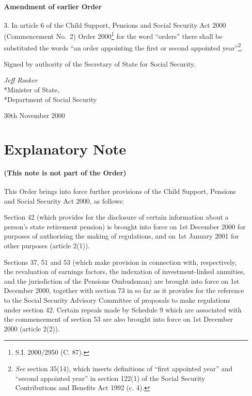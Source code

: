 \documentclass[12pt,a4paper]{article}
\begin{document}
\subsection[3. Amendment of earlier Order]{Amendment of earlier Order}

3.  In article 6 of the Child Support, Pensions and Social Security Act 2000 (Commencement No.\ 2) Order 2000\footnote{\frenchspacing S.I. 2000/2950 (C. 87).} for the word “orders” there shall be substituted the words “an order appointing the first or second appointed year”\footnote{\frenchspacing \emph{See} section 35(14), which inserts definitions of “first appointed year” and “second appointed year” in section 122(1) of the Social Security Contributions and Benefits Act 1992 (c. 4).}. 

\bigskip

Signed 
by authority of the Secretary of State for Social Security.

{\raggedleft
\emph{Jeff Rooker}\\*Minister of State,\\*Department of Social Security

}

30th November 2000

\small

\part{Explanatory Note}

\renewcommand\parthead{--- Explanatory Note}

\subsection*{(This note is not part of the Order)}

This Order brings into force further provisions of the Child Support, Pensions and Social Security Act 2000, as follows:

Section 42 (which provides for the disclosure of certain information about a person’s state retirement pension) is brought into force on 1st December 2000 for purposes of authorising the making of regulations, and on 1st January 2001 for other purposes (article 2(1)).

Sections 37, 51 and 53 (which make provision in connection with, respectively, the revaluation of earnings factors, the indexation of investment-linked annuities, and the jurisdiction of the Pensions Ombudsman) are brought into force on 1st December 2000, together with section 73 in so far as it provides for the reference to the Social Security Advisory Committee of proposals to make regulations under section 42. Certain repeals made by Schedule 9 which are associated with the commencement of section 53 are also brought into force on 1st December 2000 (article 2(2)).
\end{document}
